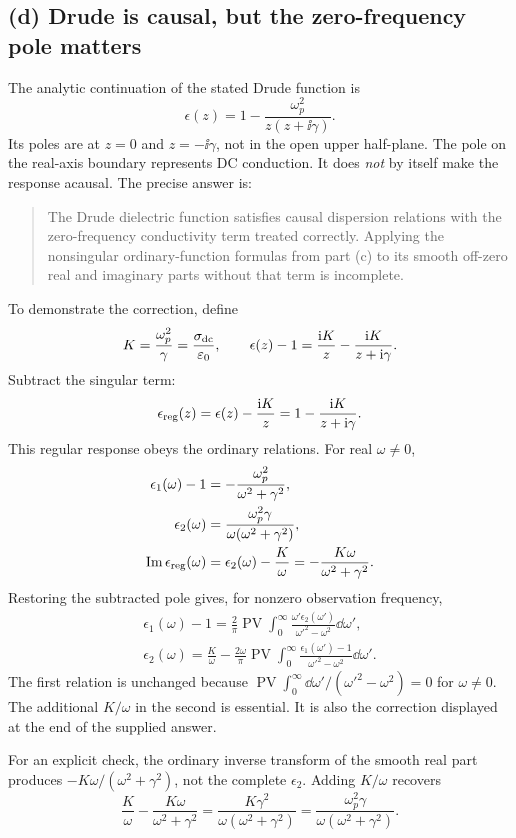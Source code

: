 \subsection*{(d) Drude is causal, but the zero-frequency pole matters}
The analytic continuation of the stated Drude function is
\[
\epsilon(z)=1-\frac{\omega_p^2}{z(z+\ii\gamma)}.
\]
Its poles are at $z=0$ and $z=-\ii\gamma$, not in the open upper half-plane. The pole on the real-axis boundary represents DC conduction. It does \emph{not} by itself make the response acausal. The precise answer is:
\begin{quote}
The Drude dielectric function satisfies causal dispersion relations with the zero-frequency conductivity term treated correctly. Applying the nonsingular ordinary-function formulas from part (c) to its smooth off-zero real and imaginary parts without that term is incomplete.
\end{quote}

To demonstrate the correction, define
\[
K=\frac{\omega_p^2}{\gamma}=\frac{\sigma_{\rm dc}}{\varepsilon_0},\qquad
\epsilon(z)-1=\frac{\mathrm{i} K}{z}-\frac{\mathrm{i} K}{z+\mathrm{i}\gamma}.
\]
Subtract the singular term:
\[
\epsilon_{\rm reg}(z)=\epsilon(z)-\frac{\mathrm{i} K}{z}
=1-\frac{\mathrm{i} K}{z+\mathrm{i}\gamma}.
\]
This regular response obeys the ordinary relations. For real $\omega\ne0$,
\begin{align*}
\epsilon_1(\omega)-1&=-\frac{\omega_p^2}{\omega^2+\gamma^2},\\
\epsilon_2(\omega)&=\frac{\omega_p^2\gamma}{\omega(\omega^2+\gamma^2)},\\
\operatorname{Im}\epsilon_{\rm reg}(\omega)
&=\epsilon_2(\omega)-\frac K\omega
=-\frac{K\omega}{\omega^2+\gamma^2}.
\end{align*}
Restoring the subtracted pole gives, for nonzero observation frequency,
\begin{align*}
\boxed{\epsilon_1(\omega)-1
=\frac2\pi\operatorname{PV}\int_0^\infty
\frac{\omega'\epsilon_2(\omega')}{\omega'^2-\omega^2}\dd\omega',}\\
\boxed{\epsilon_2(\omega)=\frac{K}{\omega}
-\frac{2\omega}{\pi}\operatorname{PV}\int_0^\infty
\frac{\epsilon_1(\omega')-1}{\omega'^2-\omega^2}\dd\omega'.}
\end{align*}
The first relation is unchanged because
$\operatorname{PV}\int_0^\infty\dd\omega'/(\omega'^2-\omega^2)=0$ for $\omega\ne0$. The additional $K/\omega$ in the second is essential. It is also the correction displayed at the end of the supplied answer.

For an explicit check, the ordinary inverse transform of the smooth real part produces
$-K\omega/(\omega^2+\gamma^2)$, not the complete $\epsilon_2$. Adding $K/\omega$ recovers
\[
\frac K\omega-\frac{K\omega}{\omega^2+\gamma^2}
=\frac{K\gamma^2}{\omega(\omega^2+\gamma^2)}
=\frac{\omega_p^2\gamma}{\omega(\omega^2+\gamma^2)}.
\]

